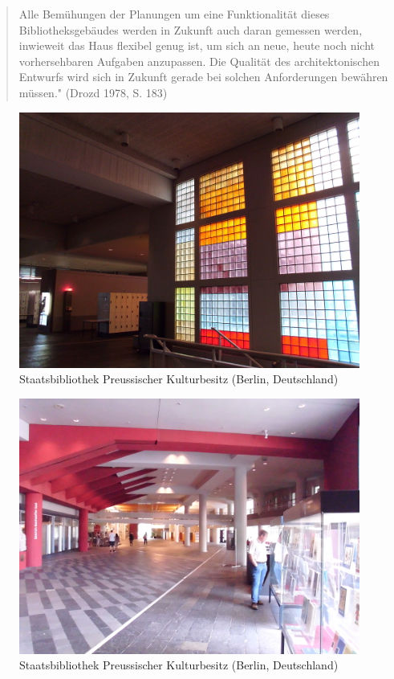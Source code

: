\documentclass[a4paper,
fontsize=11pt,
oneside,
numbers=noperiodatend,
parskip=half-,
bibliography=totoc,
final
]{scrartcl}
\begin{document}
\begin{quote}
Alle Bemühungen der Planungen um eine Funktionalität dieses
Bibliotheksgebäudes werden in Zukunft auch daran gemessen werden,
inwieweit das Haus flexibel genug ist, um sich an neue, heute noch nicht
vorhersehbaren Aufgaben anzupassen. Die Qualität des architektonischen
Entwurfs wird sich in Zukunft gerade bei solchen Anforderungen bewähren
müssen." (Drozd 1978, S. 183)
\end{quote}

\begin{figure}[htbp]
\centering
\includegraphics{./img/009.jpg}
\caption{Staatsbibliothek Preussischer Kulturbesitz (Berlin,
Deutschland)}
\end{figure}

\begin{figure}[htbp]
\centering
\includegraphics{./img/010.jpg}
\caption{Staatsbibliothek Preussischer Kulturbesitz (Berlin,
Deutschland)}
\end{figure}
\end{document}
